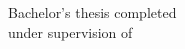\begin{center}
Bachelor's thesis completed\\
under supervision of\\
\enseignant

\bigskip
\ifthenelse{\equal{\branche}{}}{}{(\branche )}
\end{center}